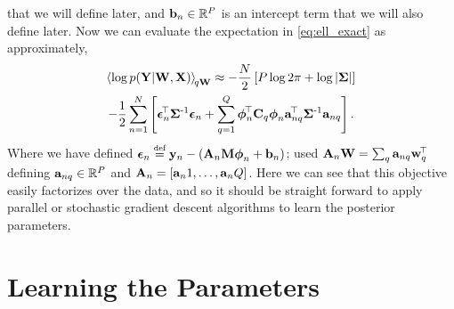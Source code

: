 that we will define later, and $\mathbf{b}_n \in \mathbb{R}^{P}$ is an intercept
term that we will also define later. Now we can evaluate the expectation in 
\eqref{eq:ell_exact} as approximately,
\begin{multline}
    \expec{q\Weights}{\log \probC{\Outs}{\Weights, \Ins}} \approx
    - \frac{N}{2}\sbrac{P\log{2\pi} + \log\deter{\Lcov}} \\
    - \frac{1}{2} \sum^N_{n=1} 
    \sbrac{
        \errorn \transpose  \Lcov\inv   \errorn  
        + \sum^Q_{q=1} 
            \feats_n\transpose\pocov_q  \feats_n\Linvec_{nq}\transpose\Lcov\inv \Linvec_{nq}
        }.
    \label{eq:ell_approx}
\end{multline}
Where we have defined $\errorn \defeq  \outs_n - (\Linmat_n\pWeights\feats_n + \intcpt_n) $; 
 used $\mathbf{A}_n\mathbf{W} = \sum_q \mathbf{a}_{nq}
\mathbf{w}_q^{\!\top}$ defining
$\mathbf{a}_{nq} \in \mathbb{R}^{P}$ and $\mathbf{A}_n = \left[{\mathbf{a}_n1, \ldots,
    \mathbf{a}_nQ}\right]$. Here we can see that this objective easily factorizes over the
data, and so it should be straight forward to apply parallel or stochastic
gradient descent algorithms to learn the posterior parameters.


\section{Learning the Parameters}

